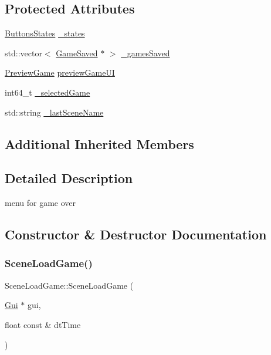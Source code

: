 \subsection*{Protected Attributes}
\begin{DoxyCompactItemize}
\item 
\hyperlink{struct_scene_load_game_1_1_buttons_states}{Buttons\+States} \hyperlink{class_scene_load_game_a5bb4d0eb575c4dcb4a1202da3cb258e2}{\+\_\+states}
\item 
std\+::vector$<$ \hyperlink{struct_scene_load_game_1_1_game_saved}{Game\+Saved} $\ast$ $>$ \hyperlink{class_scene_load_game_ad5bf77c59b06d6c3b24a62a591667b1e}{\+\_\+games\+Saved}
\item 
\hyperlink{struct_scene_load_game_1_1_preview_game}{Preview\+Game} \hyperlink{class_scene_load_game_a8f699898c6745b601e502c647e49fb75}{preview\+Game\+UI}
\item 
int64\+\_\+t \hyperlink{class_scene_load_game_aa07779d67adf894e656b24ada2385aa9}{\+\_\+selected\+Game}
\item 
std\+::string \hyperlink{class_scene_load_game_a4615279dd03f5533862a57b54f251970}{\+\_\+last\+Scene\+Name}
\end{DoxyCompactItemize}
\subsection*{Additional Inherited Members}


\subsection{Detailed Description}
menu for game over 

\subsection{Constructor \& Destructor Documentation}
\mbox{\label{class_scene_load_game_ad70a45aee99f33f244fbfaf71cee3a10}} 
\subsubsection{\texorpdfstring{Scene\+Load\+Game()}{SceneLoadGame()}\hspace{0.1cm}{\footnotesize\ttfamily [1/2]}}
{\footnotesize\ttfamily Scene\+Load\+Game\+::\+Scene\+Load\+Game (\begin{DoxyParamCaption}\item[{\hyperlink{class_gui}{Gui} $\ast$}]{gui,  }\item[{float const \&}]{dt\+Time }\end{DoxyParamCaption})}




